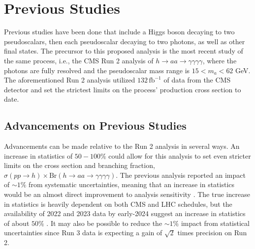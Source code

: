 \documentclass[12pt]{article}
\begin{document}
\section{Previous Studies}
Previous studies have been done that include a Higgs boson decaying to two pseudoscalars, then each pseudoscalar decaying to two photons, as well as other final states. The precursor to this proposed analysis is the most recent study of the same process, i.e., the CMS Run 2 analysis of $h\rightarrow aa \rightarrow \gamma\gamma\gamma\gamma$, where the photons are fully resolved and the pseudoscalar mass range is $15 < m_a < 62$ GeV. The aforementioned Run 2 analysis utilized $132\, \mathrm{fb}^{-1}$ of data from the CMS detector and set the strictest limits on the process' production cross section to date.\par

\subsection{Advancements on Previous Studies}
Advancements can be made relative to the Run 2 analysis in several ways. An increase in statistics of $50-100\%$ could allow for this analysis to set even stricter limits on the cross section and branching fraction, $\sigma(pp \rightarrow h) \times \mathrm{Br}(h\rightarrow aa \rightarrow \gamma\gamma\gamma\gamma)$. The previous analysis reported an impact of ${\sim}1\%$ from systematic uncertainties, meaning that an increase in statistics would be an almost direct improvement to analysis sensitivity \cite{Run2_analysis}. The true increase in statistics is heavily dependent on both CMS and LHC schedules, but the  availability of 2022 and 2023 data by early-2024 suggest an increase in statistics of about $50\%$ \cite{PC_CMS_Week}. It may also be possible to reduce the ${\sim}1\%$ impact from statistical uncertainties since Run 3 data is expecting a gain of $\sqrt{2}$ times precision on Run 2.\par
\end{document}
